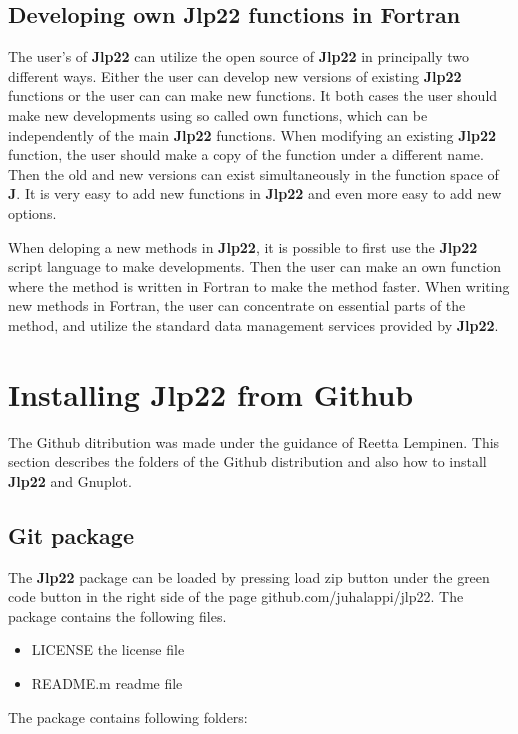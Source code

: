 \subsection{Developing own \textbf{Jlp22} functions in Fortran}
\label{intro2}
The user's of \textbf{Jlp22} can utilize the open source of \textbf{Jlp22} in principally two different ways.
Either the user can develop new versions of existing \textbf{Jlp22} functions or the user can can make new functions.
It both cases the user should make new developments using so called own functions, which can
be independently of the main \textbf{Jlp22} functions. When modifying an existing \textbf{Jlp22} function, the user should make a copy of the
function under a different name. Then the old and new versions
can exist simultaneously in the function
space of \textbf{J}. It is very easy to add new functions in \textbf{Jlp22} and even more easy to add new options.

When deloping a new methods in \textbf{Jlp22}, it is possible to first use the \textbf{Jlp22}
script language to make developments.
Then the user can make an own function where the method is written in Fortran to make the method faster.
When writing new methods in Fortran, the user can concentrate on essential parts of the method, and utilize
the standard data management services provided by \textbf{Jlp22}.
\section{ Installing \textbf{Jlp22} from Github}
\label{git}
The Github ditribution was made under the guidance of Reetta Lempinen. This section describes the
folders of the Github distribution and also how to
install \textbf{Jlp22} and Gnuplot.
\subsection{Git package}
\label{gitpack}
The \textbf{Jlp22}  package can be loaded by pressing load zip button under the green
code button in the right side of the page github.com/juhalappi/jlp22.  The package
contains the following files.

\begin{itemize}
\item LICENSE the license file
\item README.m readme file
\end{itemize}

The package contains following folders:

